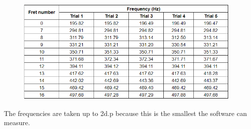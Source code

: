 \begin{figure}[!htb]
    \includegraphics[width = \textwidth]{./ee/raw_table.png}
\end{figure}
\FloatBarrier
The frequencies are taken up to 2d.p because this is the smallest the software can measure.
\FloatBarrier